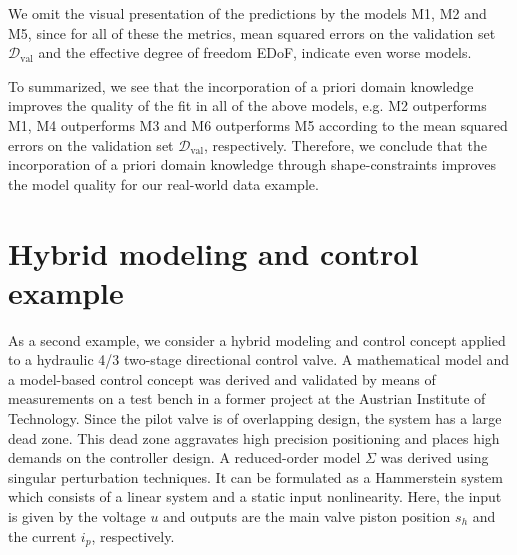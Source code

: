 We omit the visual presentation of the predictions by the models M1, M2 and M5, since for all of these the metrics, mean squared errors on the validation set $\mathcal{D}_{\text{val}}$ and the effective degree of freedom EDoF, indicate even worse models.

To summarized, we see that the incorporation of a priori domain knowledge improves the quality of the fit in all of the above models, e.g. M2 outperforms M1, M4 outperforms M3 and M6 outperforms M5 according to the mean squared errors on the validation set $\mathcal{D}_{\text{val}}$, respectively. Therefore, we conclude that the incorporation of a priori domain knowledge through shape-constraints improves the model quality for our real-world data example. 

\section{Hybrid modeling and control example} \label{sec:real-world-application2}

As a second example, we consider a hybrid modeling and control concept applied to a hydraulic 4/3 two-stage directional control valve. A mathematical model and a model-based control concept was derived and validated by means of measurements on a test bench in a former project at the Austrian Institute of Technology. Since the pilot valve is of overlapping design, the system has a large dead zone. This dead zone aggravates high precision positioning and places high demands on the controller design. A reduced-order model $\Sigma$ was derived using singular perturbation techniques. It can be formulated as a Hammerstein system which consists of a linear system and a static input nonlinearity. Here, the input is given by the voltage $u$ and outputs are the main valve piston position $s_h$ and the current $i_p$, respectively. 


